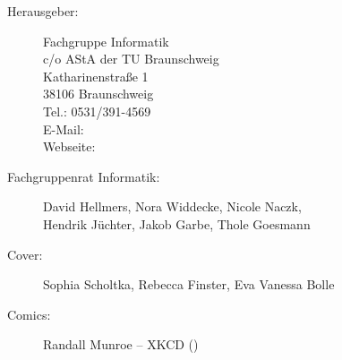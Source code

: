 
\begin{description}
\item[Herausgeber:]
	Fachgruppe Informatik\\
	c/o AStA der TU Braunschweig\\
	Katharinenstraße 1\\
	38106 Braunschweig\\
	Tel.: 0531/391-4569\\
	E-Mail: \\
	Webseite: \fginfoUrl
\item[Fachgruppenrat Informatik:] David Hellmers, Nora Widdecke, Nicole Naczk, \\Hendrik Jüchter, Jakob Garbe, Thole Goesmann 
\item[Cover:] Sophia Scholtka, Rebecca Finster, Eva Vanessa Bolle

\item[Comics:] Randall Munroe -- XKCD ()
\end{description}

